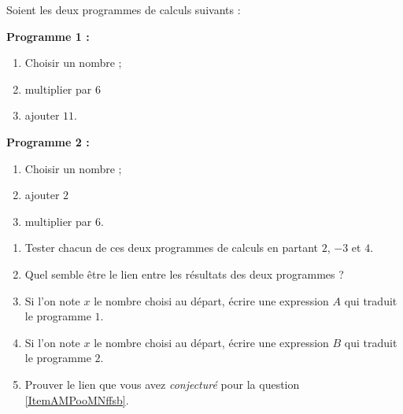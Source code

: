 
\begin{exercice}\label{exosmath-0895}

Soient les deux programmes de calculs suivants :

\begin{framed}
    {\bf Programme 1 :}
\begin{enumerate}
    \item
 Choisir un nombre ;
\item
    multiplier par \( 6\)
\item
    ajouter \( 11\).
\end{enumerate}
\end{framed}
\begin{framed}
    {\bf Programme 2 :}
\begin{enumerate}
    \item
 Choisir un nombre ;
    \item
        ajouter \( 2\)
    \item
        multiplier par \( 6\).
\end{enumerate}
\end{framed}

\begin{enumerate}
    \item
 Tester chacun de ces deux programmes de calculs en partant $2$, $-3$ et $4$.
\item   \label{ItemAMPooMNffsb}
    Quel semble être le lien entre les résultats des deux programmes ?
\item
    Si l'on note $x$ le nombre choisi au départ, écrire une expression $A$ qui traduit le programme $1$.
\item
    Si l'on note $x$ le nombre choisi au départ, écrire une expression $B$ qui traduit le programme $2$.
\item
    Prouver le lien que vous avez \emph{conjecturé} pour la question \ref{ItemAMPooMNffsb}.
\end{enumerate}

\end{exercice}
